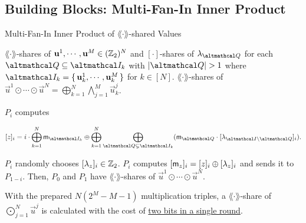 \documentclass[../240906_cryptlab_flute.tex]{subfiles}
\begin{document}
\subsection{Building Blocks: Multi-Fan-In Inner Product}
\begin{frame}{Multi-Fan-In Inner Product of \(\lang\cdot\rang\)-shared Values}
    \begin{block}{}
        \begin{description}[Output]
            \ii[Input]
            \(\lang\cdot\rang\)-shares of \(\boldsymbol{\mathbf{u}}^1, \cdots, \boldsymbol{\mathbf{u}}^M \in (\mathbb{Z}_2)^N\) and
            \([\cdot]\)-shares of \(\lambda_{\mcal{Q}}\) for each \(\mcal{Q} \subseteq \mcal{I}_k\)
            with \(|\mcal{Q}| > 1\) where \(\mcal{I}_k = \{\,\vec{u}^1_k,\cdots,\vec{u}^M_k\,\}\)
            for \(k \in [N]\).
            \ii[Output]
            \(\lang\cdot\rang\)-shares of
            \(\vec{u}^1 \odot \cdots \odot \vec{u}^N = \bigoplus_{k=1}^N \bigwedge_{j=1}^M \vec{u}^j_k\).
        \end{description}
        \pause
        \begin{enumerate}
            \ii
            \(P_i\) computes
            \centerline{\(\displaystyle
                [z]_i = i \cdot \bigoplus_{k=1}^N \msf{m}_{\mcal{I}_k}
                \oplus \bigoplus_{k=1}^N \bigoplus_{\mcal{Q} \subsetneq \mcal{I}_k} (\msf{m}_{\mcal{Q}}
                \cdot [\lambda_{\mcal{I} \setminus \mcal{Q}}]_i).
            \)}
            \pause
            \ii
            \(P_i\) randomly chooses \([\lambda_z]_i \in \mathbb{Z}_2\).
            \ii
            \(P_i\) computes \([\mathsf{m}_z]_i = [z]_i \oplus [\lambda_z]_i\)
            and sends it to \(P_{1-i}\).
            \ii
            Then, \(P_0\) and \(P_1\) have \(\lang\cdot\rang\)-shares of \(\vec{u}^1 \odot \cdots \odot \vec{u}^N\).
        \end{enumerate}
        \pause
        With the prepared \(N(2^M - M - 1)\) multiplication triples,
        a \(\lang\cdot\rang\)-share of \(\bigodot_{j=1}^N \vec{u}^j\)
        is calculated with the cost of \ul{two bits in a single round}.
    \end{block}
\end{frame}
\end{document}
